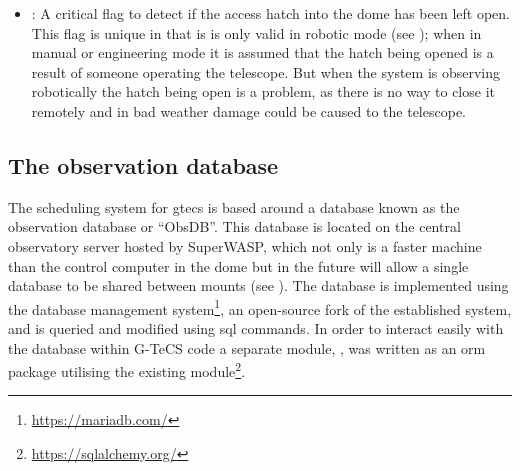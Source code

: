 \begin{colsection}
\begin{colsection}
\begin{itemize}
    \item {}: A critical flag to detect if the access hatch into the dome has been left open. This flag is unique in that is is only valid in robotic mode (see ); when in manual or engineering mode it is assumed that the hatch being opened is a result of someone operating the telescope. But when the system is observing robotically the hatch being open is a problem, as there is no way to close it remotely and in bad weather damage could be caused to the telescope.
\end{itemize}

\end{colsection}


\subsection{The observation database}
\label{sec:obsdb}
\begin{colsection}

The scheduling system for \gls{gtecs} is based around a database known as the observation database or ``ObsDB''. This database is located on the central observatory server hosted by SuperWASP, which not only is a faster machine than the control computer in the dome but in the future will allow a single database to be shared between mounts (see ). The database is implemented using the  database management system\footnote{\url{https://mariadb.com/}}, an open-source fork of the established  system, and is queried and modified using \gls{sql} commands. In order to interact easily with the database within G-TeCS code a separate  module, , was written as an \gls{orm} package utilising the existing  module\footnote{\url{https://sqlalchemy.org/}}.


\end{colsection}
\end{colsection}
